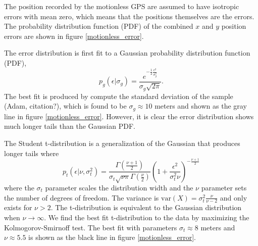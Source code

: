 \documentclass[twocol]{ametsoc}
\begin{document}
The position recorded by the motionless GPS are assumed to have isotropic errors with mean zero, which means that the positions themselves are the errors. The probability distribution function (PDF) of the combined $x$ and $y$ position errors are shown in figure \ref{motionless_error}.

The error distribution is first fit to a Gaussian probability distribution function (PDF),
\begin{equation}
\label{gaussian_pdf}
p_g(\epsilon|\sigma_g) = \frac{e^{-\frac{1}{2}\frac{\epsilon^2}{\sigma_g^2}} }{\sigma_g \sqrt{ 2 \pi}}.
\end{equation}
The best fit is produced by compute the standard deviation of the sample (Adam, citation?), which is found to be $\sigma_g \approx 10$ meters and shown as the gray line in figure \ref{motionless_error}. However, it is clear the error distribution shows much longer tails than the Gaussian PDF.

The Student t-distribution is a generalization of the Gaussian that produces longer tails where 
\begin{equation}
\label{student_pdf}
p_t\left(\epsilon |\nu,\sigma_t^2\right) = \frac{\Gamma\left( \frac{\nu + 1}{2} \right)}{\sigma_t \sqrt{\nu \pi} \Gamma\left(\frac{\nu}{2}\right)} \left( 1 + \frac{\epsilon^2}{\sigma_t^2 \nu} \right)^{-\frac{\nu+1}{2}}
\end{equation}
where the $\sigma_t$ parameter scales the distribution width and the $\nu$ parameter sets the number of degrees of freedom. The variance is $\textrm{var}(X)=\sigma_t^2 \frac{\nu}{\nu-2}$ and only exists for $\nu > 2$. The t-distribution is equivalent to the Gaussian distribution when $\nu \rightarrow \infty$. We find the best fit t-distribution to the data by maximizing the Kolmogorov-Smirnoff test. The best fit with parameters $\sigma_t \approx 8$ meters and $\nu \approx 5.5$ is shown as the black line in figure \ref{motionless_error}.
\end{document}
